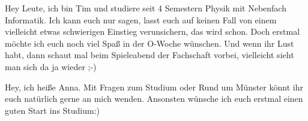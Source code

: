\begin{multicols*}{2}
\small

{Hey Leute, ich bin Tim und studiere seit 4 Semestern Physik mit Nebenfach Informatik. Ich kann euch nur sagen, lasst euch auf keinen Fall von einem vielleicht etwas schwierigen Einstieg verunsichern, das wird schon. Doch erstmal möchte ich euch noch viel Spaß in der O-Woche wünschen. Und wenn ihr Lust habt, dann schaut mal beim Spieleabend der Fachschaft vorbei, vielleicht sieht man sich da ja wieder ;-)}


{Hey, ich heiße Anna. Mit Fragen zum Studium oder Rund um Münster könnt ihr euch
	natürlich gerne an mich wenden. Ansonsten wünsche ich euch erstmal einen guten
	Start ins Studium:)
}
\vspace{0.5cm}


\end{multicols*}
